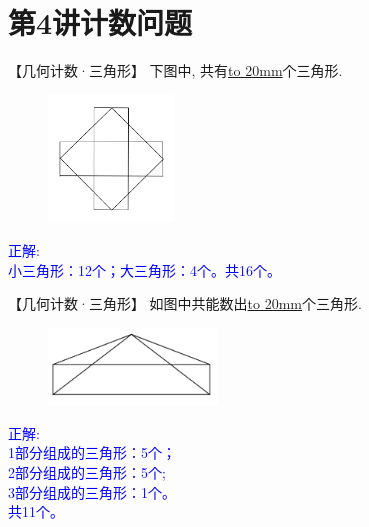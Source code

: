 \section{第4讲\quad 计数问题}

\item {
    【几何计数·三角形】
    下图中, 共有\underline{\hbox to 20mm{}}个三角形.
    \begin{figure}[H] 
        \centering
        \includegraphics[width=0.3\textwidth]{./pics/Chapter_4/12.png}
    \end{figure}
    \ifshowSolution 
        \fangsong{}\textcolor{blue}{
            正解: \\
            小三角形：12个；大三角形：4个。共16个。
        }
    \else
        \vspace{1cm}
    \fi
}

\item {
    【几何计数·三角形】
    如图中共能数出\underline{\hbox to 20mm{}}个三角形.
    \begin{figure}[H] 
        \centering
        \includegraphics[width=0.4\textwidth]{./pics/Chapter_4/2015_1.png}
    \end{figure}
    \ifshowSolution 
        \fangsong{}\textcolor{blue}{
            正解: \\
            1部分组成的三角形：5个；\\
            2部分组成的三角形：5个;\\
            3部分组成的三角形：1个。\\
            共11个。
        }
    \else
        \vspace{1cm}
    \fi
}

